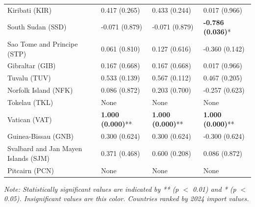 \begin{longtable}{p{5cm}p{3cm}p{3cm}p{5cm}}
Kiribati (KIR) & \textcolor{atlOrange600}{0.417 (0.265)} & \textcolor{atlOrange600}{0.433 (0.244)} & \textcolor{atlOrange600}{0.017 (0.966)} \\
South Sudan (SSD) & \textcolor{atlOrange600}{-0.071 (0.879)} & \textcolor{atlOrange600}{-0.071 (0.879)} & \textcolor{atlLime600}{\textbf{-0.786 (0.036)}*} \\
Sao Tome and Principe (STP) & \textcolor{atlOrange600}{0.061 (0.810)} & \textcolor{atlOrange600}{0.127 (0.616)} & \textcolor{atlOrange600}{-0.360 (0.142)} \\
Gibraltar (GIB) & \textcolor{atlOrange600}{0.167 (0.668)} & \textcolor{atlOrange600}{0.167 (0.668)} & \textcolor{atlOrange600}{0.017 (0.966)} \\
Tuvalu (TUV) & \textcolor{atlOrange600}{0.533 (0.139)} & \textcolor{atlOrange600}{0.567 (0.112)} & \textcolor{atlOrange600}{0.467 (0.205)} \\
Norfolk Island (NFK) & \textcolor{atlOrange600}{0.086 (0.872)} & \textcolor{atlOrange600}{0.203 (0.700)} & \textcolor{atlOrange600}{-0.257 (0.623)} \\
Tokelau (TKL) & None & None & None \\
Vatican (VAT) & \textcolor{atlLime600}{\textbf{1.000 (0.000)}**} & \textcolor{atlLime600}{\textbf{1.000 (0.000)}**} & \textcolor{atlLime600}{\textbf{1.000 (0.000)}**} \\
Guinea-Bissau (GNB) & \textcolor{atlOrange600}{0.300 (0.624)} & \textcolor{atlOrange600}{0.300 (0.624)} & \textcolor{atlOrange600}{-0.300 (0.624)} \\
Svalbard and Jan Mayen Islands (SJM) & \textcolor{atlOrange600}{0.371 (0.468)} & \textcolor{atlOrange600}{0.600 (0.208)} & \textcolor{atlOrange600}{0.086 (0.872)} \\
Pitcairn (PCN) & None & None & None \\
\end{longtable}

\textit{Note: Statistically significant values are indicated by \textcolor{atlLime600}{**} (p $<$ 0.01) and \textcolor{atlLime600}{*} (p $<$ 0.05). Insignificant values are \textcolor{atlOrange600}{this color}. Countries ranked by 2024 import values.}